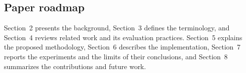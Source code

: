 \subsection{Paper roadmap}

Section~2 presents the background, Section~3 defines the terminology, and Section~4 reviews related work and its evaluation practices.
Section~5 explains the proposed methodology, Section~6 describes the implementation, Section~7 reports the experiments and the limits of their conclusions, and Section~8 summarizes the contributions and future work.
